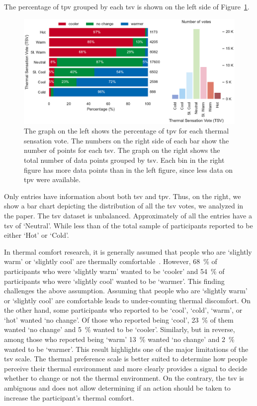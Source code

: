 The percentage of \ac{tpv} grouped by each \ac{tsv} is shown on the left side of Figure~\ref{fig:bar_plot_tp_by_ts}.
\begin{figure}[htb!]
    \centering
    \includegraphics[width=\textwidth]{figures/bar_plot_tp_by_ts}
    \caption{The graph on the left shows the percentage of \ac{tpv} for each thermal sensation vote.
    The numbers on the right side of each bar show the number of points for each \ac{tsv}.
    The graph on the right shows the total number of data points grouped by \ac{tsv}.
    Each bin in the right figure has more data points than in the left figure, since less data on \ac{tpv} were available.}
    \label{fig:bar_plot_tp_by_ts}
\end{figure}
Only  entries have information about both \ac{tsv} and \ac{tpv}.
Thus, on the right, we show a bar chart depicting the distribution of all the \ac{tsv} votes, we analyzed in the paper.
The \ac{tsv} dataset is unbalanced.
Approximately  of all the entries have a \ac{tsv} of `Neutral'.
While less than  of the total sample of participants reported to be either `Hot' or `Cold'.

In thermal comfort research, it is generally assumed that people who are `slightly warm' or `slightly cool' are thermally comfortable~\cite{Fanger1970, schweiker2020evaluating}.
However, \qty{68}{\percent} of participants who were `slightly warm' wanted to be `cooler' and \qty{54}{\percent} of participants who were `slightly cool' wanted to be `warmer'.
This finding challenges the above assumption.
Assuming that people who are `slightly warm' or `slightly cool' are comfortable leads to under-counting thermal discomfort.
On the other hand, some participants who reported to be `cool', `cold', `warm', or `hot' wanted `no change'.
Of those who reported being `cool', \qty{23}{\percent} of them wanted `no change' and \qty{5}{\percent} wanted to be `cooler'.
Similarly, but in reverse, among those who reported being `warm' \qty{13}{\percent} wanted `no change' and \qty{2}{\percent} wanted to be `warmer'.
This result highlights one of the major limitations of the \ac{tsv} scale.
The thermal preference scale is better suited to determine how people perceive their thermal environment and more clearly provides a signal to decide whether to change or not the thermal environment.
On the contrary, the \ac{tsv} is ambiguous and does not allow determining if an action should be taken to increase the participant's thermal comfort.

